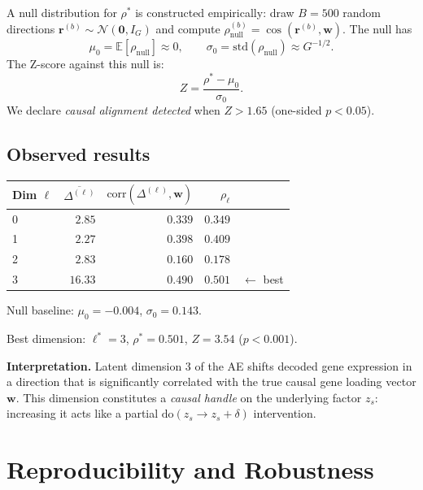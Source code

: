 \documentclass[11pt,a4paper]{article}
\newcommand{\E}{\mathbb{E}}
\newcommand{\N}{\mathcal{N}}
\newcommand{\doop}{\mathrm{do}}
\theoremstyle{definition}
\begin{document}
A null distribution for $\rho^*$ is constructed empirically: draw
$B = 500$ random directions $\bm{r}^{(b)} \sim \N(\bm{0}, I_G)$ and compute
$\rho_{\mathrm{null}}^{(b)} = \cos(\bm{r}^{(b)}, \bm{w})$.  The null has
\begin{equation}
  \mu_0 = \E[\rho_{\mathrm{null}}] \approx 0, \qquad
  \sigma_0 = \mathrm{std}(\rho_{\mathrm{null}}) \approx G^{-1/2}.
\end{equation}
The Z-score against this null is:
\begin{equation}
  Z = \frac{\rho^* - \mu_0}{\sigma_0}.
  \label{eq:z_score}
\end{equation}
We declare \emph{causal alignment detected} when $Z > 1.65$
(one-sided $p < 0.05$).

\subsection{Observed results}

\begin{center}
\begin{tabular}{lrrrr}
\toprule
Dim $\ell$ & $\overline{\Delta^{(\ell)}}$ & $\mathrm{corr}(\Delta^{(\ell)}, \bm{w})$ & $\rho_\ell$ & \\
\midrule
0 & $2.85$  & $0.339$ & $0.349$ &\\
1 & $2.27$  & $0.398$ & $0.409$ &\\
2 & $2.83$  & $0.160$ & $0.178$ &\\
3 & $16.33$ & $0.490$ & $0.501$ & $\leftarrow$ best\\
\bottomrule
\end{tabular}
\end{center}

\noindent Null baseline: $\mu_0 = -0.004$, $\sigma_0 = 0.143$.

\medskip
\noindent Best dimension: $\ell^* = 3$,\quad
$\rho^* = 0.501$,\quad
$Z = 3.54$ \quad ($p < 0.001$).

\medskip
\noindent \textbf{Interpretation.} Latent dimension 3 of the AE
shifts decoded gene expression in a direction that is significantly
correlated with the true causal gene loading vector $\bm{w}$.
This dimension constitutes a \emph{causal handle} on the underlying
factor $z_s$: increasing it acts like a partial
$\doop(z_s \to z_s + \delta)$ intervention.

\section{Reproducibility and Robustness}
\label{sec:reproducibility}
\end{document}
